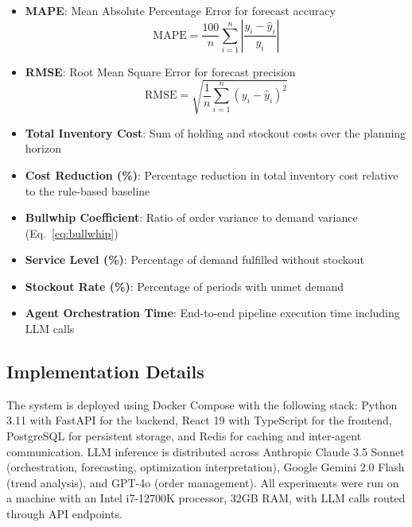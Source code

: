 \documentclass[conference]{IEEEtran}
\begin{document}
\begin{itemize}
    \item \textbf{MAPE}: Mean Absolute Percentage Error for forecast accuracy
    \begin{equation}
        \text{MAPE} = \frac{100}{n} \sum_{i=1}^{n} \left| \frac{y_i - \hat{y}_i}{y_i} \right|
    \end{equation}
    
    \item \textbf{RMSE}: Root Mean Square Error for forecast precision
    \begin{equation}
        \text{RMSE} = \sqrt{\frac{1}{n} \sum_{i=1}^{n} (y_i - \hat{y}_i)^2}
    \end{equation}
    
    \item \textbf{Total Inventory Cost}: Sum of holding and stockout costs over the planning horizon
    
    \item \textbf{Cost Reduction (\%)}: Percentage reduction in total inventory cost relative to the rule-based baseline
    
    \item \textbf{Bullwhip Coefficient}: Ratio of order variance to demand variance (Eq.~\ref{eq:bullwhip})
    
    \item \textbf{Service Level (\%)}: Percentage of demand fulfilled without stockout
    
    \item \textbf{Stockout Rate (\%)}: Percentage of periods with unmet demand
    
    \item \textbf{Agent Orchestration Time}: End-to-end pipeline execution time including LLM calls
\end{itemize}

\subsection{Implementation Details}

The system is deployed using Docker Compose with the following stack: Python 3.11 with FastAPI for the backend, React 19 with TypeScript for the frontend, PostgreSQL for persistent storage, and Redis for caching and inter-agent communication. LLM inference is distributed across Anthropic Claude 3.5 Sonnet (orchestration, forecasting, optimization interpretation), Google Gemini 2.0 Flash (trend analysis), and GPT-4o (order management). All experiments were run on a machine with an Intel i7-12700K processor, 32GB RAM, with LLM calls routed through API endpoints.
\end{document}
